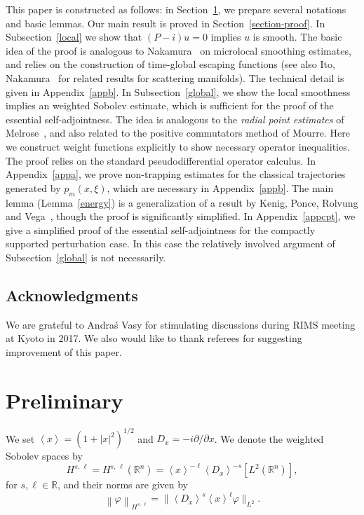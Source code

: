 \documentclass[AHL,Unicode,longabstracts,published]{cedram}
\newcommand*\f{\varphi}
\newcommand*\x{\xi}
\newcommand*\re{\mathbb{R}}
\newcommand*\pa{\partial}
\newcommand{\jap}[1]{\left\langle #1 \right\rangle}
\newcommand{\norm}[1]{\left\| #1 \right\|}
\newcommand{\bignorm}[1]{\bigl\| #1 \bigr\|}
\begin{document}
This paper is constructed as follows: in Section~\ref{pre}, we prepare several notations and basic lemmas. Our main result is proved in Section~\ref{section-proof}. In Subsection~\ref{local} we show that $(P-i)u=0$ implies $u$ is smooth. The basic idea of the proof is analogous to Nakamura~\cite{N} on microlocal smoothing estimates, and relies on the construction of time-global escaping functions (see also Ito, Nakamura~\cite{IN} for related results for scattering manifolds). The technical detail is given in Appendix~\ref{appb}. In Subsection~\ref{global}, we show the local smoothness implies an weighted Sobolev estimate, which is sufficient for the proof of the essential self-adjointness. The idea is analogous to the {\em radial point estimates}\/ of Melrose~\cite{M}, and also related to the positive commutators method of Mourre. Here we construct weight functions explicitly to show necessary operator inequalities. The proof relies on the standard pseudodifferential operator calculus. In Appendix~\ref{appa}, we prove non-trapping estimates for the classical trajectories generated by $p_m(x,\x)$, which are necessary in Appendix~\ref{appb}. The main lemma (Lemma~\ref{energy}) is a generalization of a result by Kenig, Ponce, Rolvung and Vega~\cite{KPRV}, though the proof is significantly simplified. In Appendix~\ref{appcpt}, we give a simplified proof of the essential self-adjointness for the compactly supported perturbation case. In this case the relatively involved argument of Subsection~\ref{global} is not necessarily.
%

\subsection*{Acknowledgments}
We are grateful to Andra\'s Vasy for stimulating discussions during RIMS meeting at Kyoto in 2017. We also would like to thank referees for suggesting improvement of this paper.



\section{Preliminary}\label{pre}
We set $\jap{x}=(1+|x|^2)^{1/2}$ and $D_x=-i\pa/\pa x$. We denote the weighted Sobolev spaces by
\[
H^{s,\,\ell} = H^{s,\,\ell}(\re^n) = \jap{x}^{-\ell}\jap{D_x}^{-s}\left[L^2(\re^n)\right],
\]
for $s,\ell\in\re$, and their norms are given by
\[
\norm{\f}_{H^{s,\,\ell}} = \bignorm{\jap{D_x}^s \jap{x}^\ell \f}_{L^2}.
\]
\end{document}
